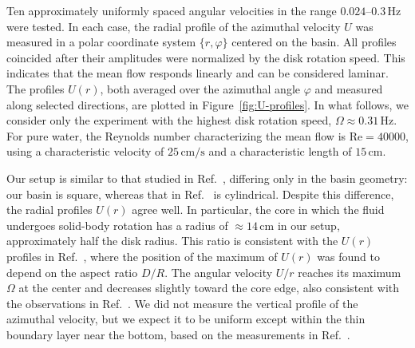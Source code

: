 \documentclass[aps,twocolumn]{revtex4-2}
\begin{document}
Ten approximately uniformly spaced angular velocities in the range $0.024$--$0.3\,\text{Hz}$ were tested. In each case, the radial profile of the azimuthal velocity $U$ was measured in a polar coordinate system $\{r,\varphi\}$ centered on the basin. All profiles coincided after their amplitudes were normalized by the disk rotation speed. This indicates that the mean flow responds linearly and can be considered laminar. The profiles $U(r)$, both averaged over the azimuthal angle $\varphi$ and measured along selected directions, are plotted in Figure~\ref{fig:U-profiles}. In what follows, we consider only the experiment with the highest disk rotation speed, $\Omega \approx 0.31\,\text{Hz}$. For pure water, the Reynolds number characterizing the mean flow is $\mathrm{Re} = 40 000$, using a characteristic velocity of $25\,\text{cm}/\text{s}$ and a characteristic length of $15\,\text{cm}$.

Our setup is similar to that studied in Ref.~\cite{yang2019axisymmetric}, differing only in the basin geometry: our basin is square, whereas that in Ref.~\cite{yang2019axisymmetric} is cylindrical. Despite this difference, the radial profiles $U(r)$ agree well. In particular, the core in which the fluid undergoes solid-body rotation has a radius of \hbox{$\approx 14\,\text{cm}$} in our setup, approximately half the disk radius. This ratio is consistent with the $U(r)$ profiles in Ref.~\cite{yang2019axisymmetric}, where the position of the maximum of $U(r)$ was found to depend on the aspect ratio $D/R$. The angular velocity $U/r$ reaches its maximum $\Omega$ at the center and decreases slightly toward the core edge, also consistent with the observations in Ref.~\cite{yang2019axisymmetric}. We did not measure the vertical profile of the azimuthal velocity, but we expect it to be uniform except within the thin boundary layer near the bottom, based on the measurements in Ref.~\cite{yang2019axisymmetric}.
\end{document}
